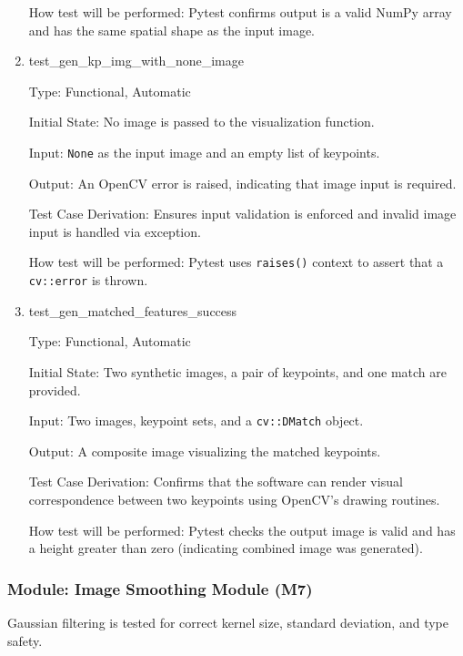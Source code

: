 \documentclass[12pt, titlepage]{article}
\begin{document}
\begin{enumerate}
How test will be performed: Pytest confirms output is a valid NumPy array and has the same spatial shape as the input image.


\item{test\_gen\_kp\_img\_with\_none\_image\\}

Type: Functional, Automatic

Initial State: No image is passed to the visualization function.

Input: \texttt{None} as the input image and an empty list of keypoints.

Output: An OpenCV error is raised, indicating that image input is required.

Test Case Derivation: Ensures input validation is enforced and invalid image input is handled via exception.

How test will be performed: Pytest uses \texttt{raises()} context to assert that a \texttt{cv::error} is thrown.



\item{test\_gen\_matched\_features\_success\\}

Type: Functional, Automatic

Initial State: Two synthetic images, a pair of keypoints, and one match are provided.

Input: Two images, keypoint sets, and a \texttt{cv::DMatch} object.

Output: A composite image visualizing the matched keypoints.

Test Case Derivation: Confirms that the software can render visual correspondence between two keypoints using OpenCV's drawing routines.

How test will be performed: Pytest checks the output image is valid and has a height greater than zero (indicating combined image was generated).

\end{enumerate}



\subsubsection{Module: Image Smoothing Module (M7)}
Gaussian filtering is tested for correct kernel size, standard deviation, and type safety.
\end{document}
